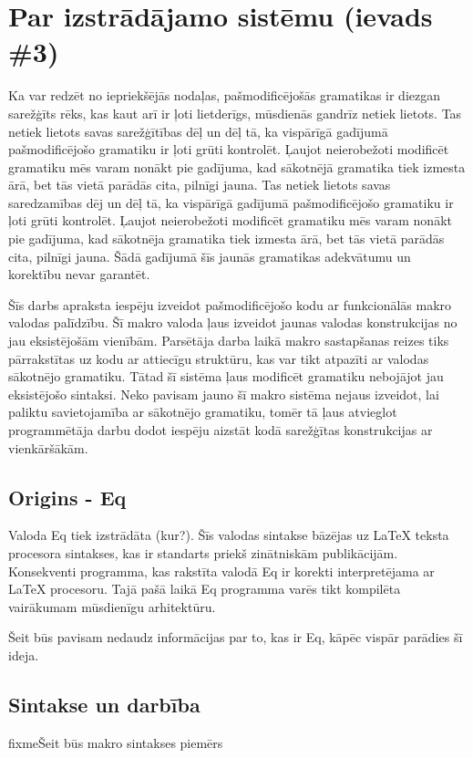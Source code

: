 \section{Par izstrādājamo sistēmu (ievads \#3)}
Ka var redzēt no iepriekšējās nodaļas, pašmodificējošās gramatikas ir diezgan sarežģīts rēks, kas kaut arī ir ļoti lietderīgs, mūsdienās gandrīz netiek lietots. Tas netiek lietots savas sarežģītības dēļ un dēļ tā, ka vispārīgā gadījumā pašmodificējošo gramatiku ir ļoti grūti kontrolēt. Ļaujot neierobežoti modificēt gramatiku mēs varam nonākt pie gadījuma, kad sākotnējā gramatika tiek izmesta ārā, bet tās vietā parādās cita, pilnīgi jauna. Tas netiek lietots savas saredzamības dēj un dēļ tā, ka vispārīgā gadījumā pašmodificējošo gramatiku ir ļoti grūti kontrolēt. Ļaujot neierobežoti modificēt gramatiku mēs varam nonākt pie gadījuma, kad sākotnēja gramatika tiek izmesta ārā, bet tās vietā parādās cita, pilnīgi jauna. Šādā gadījumā šīs jaunās gramatikas adekvātumu un korektību nevar garantēt.

Šīs darbs apraksta iespēju izveidot pašmodificējošo kodu ar funkcionālās makro valodas palīdzību. Šī makro valoda ļaus izveidot jaunas valodas konstrukcijas no jau eksistējošām vienībām. Parsētāja darba laikā makro sastapšanas reizes tiks pārrakstītas uz kodu ar attiecīgu struktūru, kas var tikt atpazīti ar valodas sākotnējo gramatiku. Tātad šī sistēma ļaus modificēt gramatiku nebojājot jau eksistējošo sintaksi. Neko pavisam jauno šī makro sistēma nejaus izveidot, lai paliktu savietojamība ar sākotnējo gramatiku, tomēr tā ļaus atvieglot programmētāja darbu dodot iespēju aizstāt kodā sarežģītas konstrukcijas ar vienkāršākām. 
\subsection{Origins - Eq}
Valoda Eq tiek izstrādāta (kur?). Šīs valodas sintakse bāzējas uz LaTeX teksta procesora sintakses, kas ir standarts priekš zinātniskām publikācijām. Konsekventi programma, kas rakstīta valodā Eq ir korekti interpretējama ar LaTeX procesoru. Tajā pašā laikā Eq programma varēs tikt kompilēta vairākumam mūsdienīgu arhitektūru. 

Šeit būs pavisam nedaudz informācijas par to, kas ir Eq, kāpēc vispār parādies šī ideja.

\subsection{Sintakse un darbība}
fixme{Šeit būs makro sintakses piemērs} 

